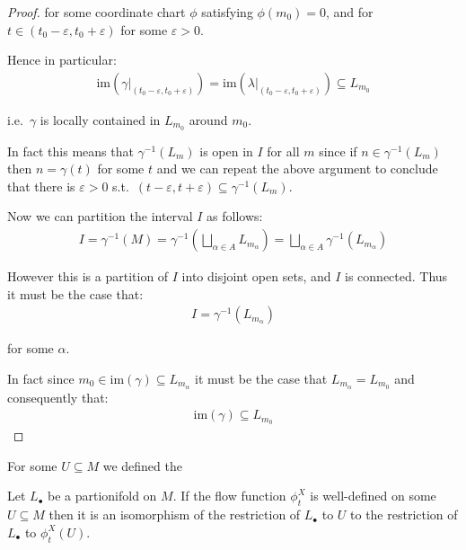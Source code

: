 \begin{proof}
        for some coordinate chart $\phi$ satisfying $\phi(m_0) = 0$, and for $t \in (t_0 - \varepsilon, t_0 + \varepsilon)$ for some $\varepsilon > 0$.

        Hence in particular:
        \begin{align*}
            \text{im}(\gamma|_{(t_0 - \varepsilon, t_0 + \varepsilon)}) = \text{im}(\lambda|_{(t_0 - \varepsilon, t_0 + \varepsilon)}) \subseteq L_{m_0}
        \end{align*}

        i.e.\ $\gamma$ is locally contained in $L_{m_0}$ around $m_0$.

        In fact this means that $\gamma^{-1}(L_{m})$ is open in $I$ for all $m$ since if $n \in \gamma^{-1}(L_{m})$ then $n = \gamma(t)$ for some $t$ and we can repeat the above argument to conclude that there is $\varepsilon > 0$ s.t.\ $(t - \varepsilon, t + \varepsilon) \subseteq \gamma^{-1}(L_m)$.

        Now we can partition the interval $I$ as follows:
        \begin{align*}
            I = \gamma^{-1}(M) = \gamma^{-1}\left(\bigsqcup_{\alpha \in A} L_{m_\alpha}\right) = \bigsqcup_{\alpha \in A} \gamma^{-1}(L_{m_\alpha})
        \end{align*}

        However this is a partition of $I$ into disjoint open sets, and $I$ is connected. Thus it must be the case that:
        \begin{align*}
            I = \gamma^{-1}(L_{m_\alpha})
        \end{align*}

        for some $\alpha$.

        In fact since $m_0 \in \text{im}(\gamma) \subseteq L_{m_\alpha}$ it must be the case that $L_{m_\alpha} = L_{m_0}$ and consequently that:
        \begin{align*}
            \text{im}(\gamma) \subseteq L_{m_0}
        \end{align*}
    \end{proof}

    \begin{definition}
        For some $U \subseteq M$ we defined the 
    \end{definition}

    \begin{prop}
        Let $L_\bullet$ be a partionifold on $M$. If the flow function $\phi_t^X$ is well-defined on some $U \subseteq M$ then it is an isomorphism of the restriction of $L_\bullet$ to $U$ to the restriction of $L_\bullet$ to $\phi_t^X(U)$.
    \end{prop}
    
